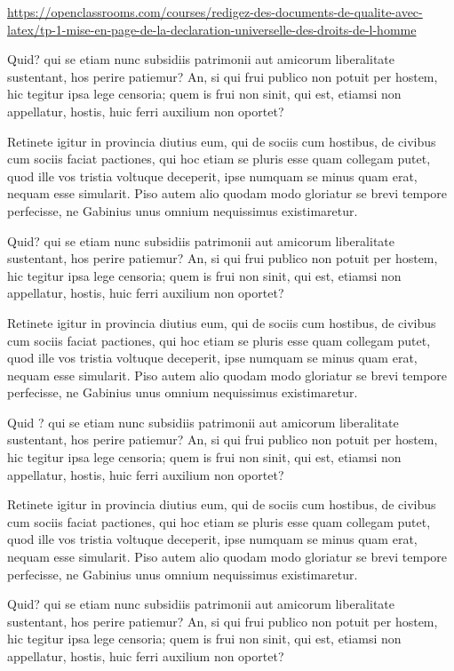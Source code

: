 \documentclass{report}
\begin{document}
\url{https://openclassrooms.com/courses/redigez-des-documents-de-qualite-avec-latex/tp-1-mise-en-page-de-la-declaration-universelle-des-droits-de-l-homme}

Quid? qui se etiam nunc subsidiis patrimonii aut amicorum liberalitate sustentant,
hos perire patiemur? An, si qui frui publico non potuit per hostem, hic tegitur ipsa
lege censoria; quem is frui non sinit, qui est, etiamsi non appellatur, hostis, huic
ferri auxilium non oportet?

Retinete igitur in provincia diutius eum, qui de sociis
cum hostibus, de civibus cum sociis faciat pactiones, qui hoc etiam se pluris esse
quam collegam putet, quod ille vos tristia voltuque deceperit, ipse numquam se minus
quam erat, nequam esse simularit. Piso autem alio quodam modo gloriatur se brevi
tempore perfecisse,
ne Gabinius unus omnium nequissimus existimaretur.

Quid? qui se etiam nunc subsidiis patrimonii aut amicorum liberalitate sustentant,
hos perire patiemur? An, si qui frui publico non potuit per hostem, hic tegitur ipsa
lege censoria; quem is frui non sinit, qui est, etiamsi non appellatur, hostis, huic
ferri auxilium non oportet?

Retinete igitur in provincia diutius eum, qui de sociis
cum hostibus, de civibus cum sociis faciat pactiones, qui hoc etiam se pluris esse
quam collegam putet, quod ille vos tristia voltuque deceperit, ipse numquam se minus
quam erat, nequam esse simularit. Piso autem alio quodam modo gloriatur se brevi
tempore perfecisse,
ne Gabinius unus omnium nequissimus existimaretur.

{\LARGE Quid ?}
qui se etiam nunc subsidiis patrimonii aut amicorum liberalitate sustentant,
hos perire patiemur? An, si qui frui publico non potuit per hostem, hic tegitur ipsa
lege censoria; quem is frui non sinit, qui est, etiamsi non appellatur, hostis, huic
ferri auxilium non oportet?

\begin{bf}
Retinete igitur in provincia diutius eum, qui de sociis
cum hostibus, de civibus cum sociis faciat pactiones, qui hoc etiam se pluris esse
quam collegam putet, quod ille vos tristia voltuque deceperit, ipse numquam se minus
quam erat, nequam esse simularit. Piso autem alio quodam modo gloriatur se brevi
tempore perfecisse,
ne Gabinius unus omnium nequissimus existimaretur.
\end{bf}

Quid? qui se etiam nunc subsidiis patrimonii aut amicorum liberalitate sustentant,
hos perire patiemur? An, si qui frui publico non potuit per hostem, hic tegitur ipsa
lege censoria; quem is frui non sinit, qui est, etiamsi non appellatur, hostis, huic
ferri auxilium non oportet?
\end{document}
